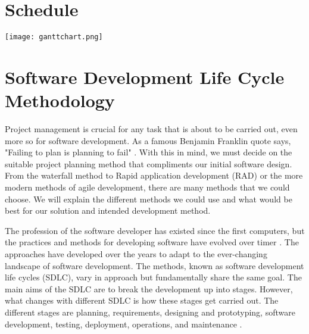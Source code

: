 \chapter{Schedule}
\begin{landscape}
	
	\begin{center}
		\item\texttt{[image: ganttchart.png]}
	\end{center}
\end{landscape}

\chapter{Software Development Life Cycle Methodology}
Project management is crucial for any task that is about to be carried out, even more so for software development. As a famous Benjamin Franklin quote says, "Failing to plan is planning to fail" \cite{plan_to_fail}. With this in mind, we must decide on the suitable project planning method that compliments our initial software design. From the waterfall method to Rapid application development (RAD) or the more modern methods of agile development, there are many methods that we could choose. We will explain the different methods we could use and what would be best for our solution and intended development method.

The profession of the software developer has existed since the first computers, but the practices and methods for developing software have evolved over timer \cite{SDLC}. The approaches have developed over the years to adapt to the ever-changing landscape of software development. The methods, known as software development life cycles (SDLC), vary in approach but fundamentally share the same goal. The main aims of the SDLC are to break the development up into stages. However, what changes with different SDLC is how these stages get carried out. The different stages are planning, requirements, designing and prototyping, software development, testing, deployment, operations, and maintenance \cite{SDLC}.

